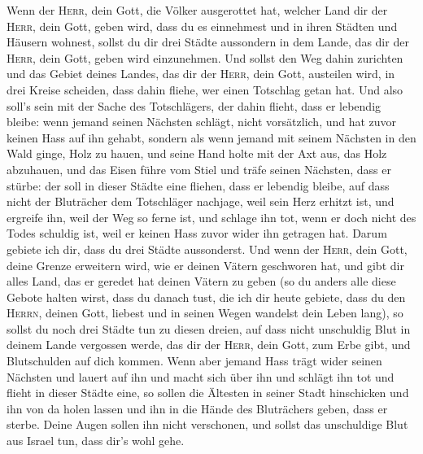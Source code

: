  Wenn der \textsc{Herr}, dein Gott, die Völker ausgerottet
hat, welcher Land dir der \textsc{Herr}, dein Gott, geben wird, dass du
es einnehmest und in ihren Städten und Häusern wohnest, 
sollst du dir drei Städte aussondern in dem Lande, das dir der
\textsc{Herr}, dein Gott, geben wird einzunehmen.  Und
sollst den Weg dahin zurichten und das Gebiet deines Landes, das dir der
\textsc{Herr}, dein Gott, austeilen wird, in drei Kreise scheiden, dass
dahin fliehe, wer einen Totschlag getan hat.  Und also
soll's sein mit der Sache des Totschlägers, der dahin flieht, dass er
lebendig bleibe: wenn jemand seinen Nächsten schlägt, nicht vorsätzlich,
und hat zuvor keinen Hass auf ihn gehabt,  sondern als
wenn jemand mit seinem Nächsten in den Wald ginge, Holz zu hauen, und
seine Hand holte mit der Axt aus, das Holz abzuhauen, und das Eisen
führe vom Stiel und träfe seinen Nächsten, dass er stürbe: der soll in
dieser Städte eine fliehen, dass er lebendig bleibe,  auf
dass nicht der Bluträcher dem Totschläger nachjage, weil sein Herz
erhitzt ist, und ergreife ihn, weil der Weg so ferne ist, und schlage
ihn tot, wenn er doch nicht des Todes schuldig ist, weil er keinen Hass
zuvor wider ihn getragen hat.  Darum gebiete ich dir, dass
du drei Städte aussonderst.  Und wenn der \textsc{Herr},
dein Gott, deine Grenze erweitern wird, wie er deinen Vätern geschworen
hat, und gibt dir alles Land, das er geredet hat deinen Vätern zu geben
 (so du anders alle diese Gebote halten wirst, dass du
danach tust, die ich dir heute gebiete, dass du den \textsc{Herrn},
deinen Gott, liebest und in seinen Wegen wandelst dein Leben lang), so
sollst du noch drei Städte tun zu diesen dreien,  auf
dass nicht unschuldig Blut in deinem Lande vergossen werde, das dir der
\textsc{Herr}, dein Gott, zum Erbe gibt, und Blutschulden auf dich
kommen.  Wenn aber jemand Hass trägt wider seinen
Nächsten und lauert auf ihn und macht sich über ihn und schlägt ihn tot
und flieht in dieser Städte eine,  so sollen die Ältesten
in seiner Stadt hinschicken und ihn von da holen lassen und ihn in die
Hände des Bluträchers geben, dass er sterbe.  Deine Augen
sollen ihn nicht verschonen, und sollst das unschuldige Blut aus Israel
tun, dass dir's wohl gehe.

